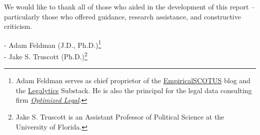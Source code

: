 \noindent We would like to thank all of those who aided in the development of this report -- particularly those who offered guidance, research assistance, and constructive criticism. \\

\begin{flushright}
- Adam Feldman (J.D., Ph.D.)\footnote{Adam Feldman serves as chief proprietor of the \href{https://empiricalscotus.com/}{EmpiricalSCOTUS} blog and the \href{https://legalytics.substack.com/}{Legalytics} Substack. He is also the principal for the legal data consulting firm \href{https://empiricalscotus.com/optimizedlegal/}{\emph{Optimized Legal}}.}\\
- Jake S. Truscott (Ph.D.)\footnote{Jake S. Truscott is an Assistant Professor of Political Science at the University of Florida.}
\end{flushright}

